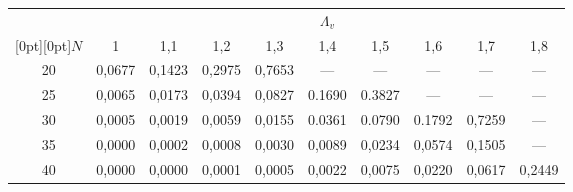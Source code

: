\renewcommand{\figurename}{\protect\bf Рис.}
\renewcommand{\tablename}{\protect\bf Таблица}
\addtocounter{table}{2}

\begin{table}\small %
\begin{center}
\parbox{400pt}{
}

\vspace*{2ex}

\tabcolsep=8pt
\begin{tabular}{|c|c|c|c|c|c|c|c|c|c|}
\hline
&\multicolumn{9}{c|}{$\Lambda_v$}\\
\cline{2-10}
\multicolumn{1}{|c|}{\raisebox{4pt}[0pt][0pt]{$N$}}&1&1{,}1&1{,}2&1{,}3&1{,}4&1{,}5&1{,}6&1{,}7&1{,}8\\
\hline
20&0,0677&0,1423&0,2975&0,7653&---&---&---&---&---\\
25&0,0065&0,0173&0,0394&0,0827&0.1690&0.3827&---&---&---\\
30&0,0005&0,0019&0,0059&0,0155&0.0361&0.0790&0.1792&0,7259&---\\
35&0,0000&0,0002&0,0008&0,0030&0,0089&0,0234&0,0574&0,1505&---\\
40&0,0000&0,0000&0,0001&0,0005&0,0022&0,0075&0,0220&0,0617&0,2449\\
\hline
\end{tabular}
\end{center}
\vspace*{6pt}
\begin{center}
\parbox{400pt}{
}

\vspace*{2ex}


\end{center}
\end{table}
